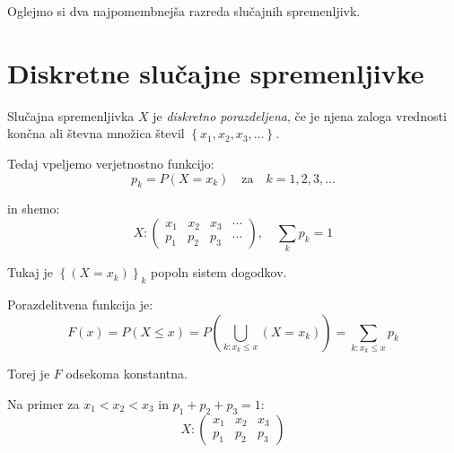 \documentclass[12pt]{book}
\def\n{\noindent}
\theoremstyle{definition}
\theoremstyle{plain}
\theoremstyle{plain}
\theoremstyle{plain}
\theoremstyle{remark}
\begin{document}
Oglejmo si dva najpomembnejša razreda slučajnih spremenljivk. 

\section{Diskretne slučajne spremenljivke}

Slučajna spremenljivka $X$ je \emph{diskretno porazdeljena}, če je njena zaloga vrednosti končna ali števna množica števil $\left\{x_1, x_2, x_3, \ldots\right\}$.

\n Tedaj vpeljemo verjetnostno funkcijo:
$$
p_k=P\left(X=x_k\right) \quad \text{za} \quad k=1, 2, 3, \ldots
$$

in shemo:
$$
X:\left(\begin{array}{cccc}
    x_1 & x_2 & x_3 & \cdots \\
    p_1 & p_2 & p_3 & \cdots
    \end{array}\right)
    , \quad \sum_k p_k=1
$$

\n Tukaj je $\left\{\left(X=x_k\right)\right\}_k$ popoln sistem dogodkov.

\n Porazdelitvena funkcija je: 
$$
F(x)=P(X \leq x)=P\left(\bigcup_{k:x_k\leq x}{\left(X=x_k\right)}\right) = \sum_{k :x_k \leq x} p_k
$$

\n Torej je $F$ odsekoma konstantna.

\n Na primer za $x_1<x_2<x_3$ in $p_1+p_2+p_3=1$:
$$
X:\left(\begin{array}{ccc}
    x_1 & x_2 & x_3 \\
    p_1 & p_2 & p_3
    \end{array}\right)
$$
\end{document}
